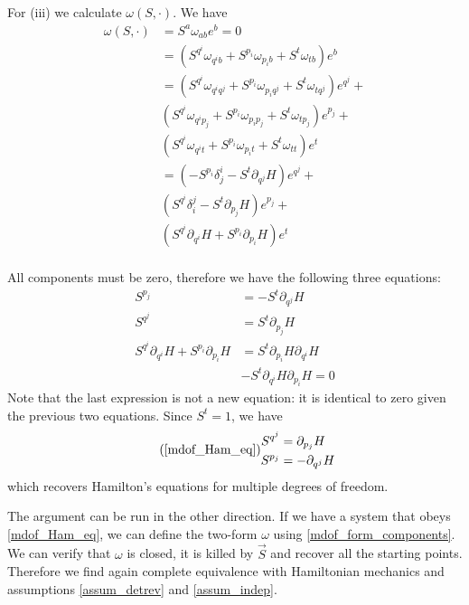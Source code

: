 \documentclass[10pt,twocolumn, nofootinbib]{revtex4-2}
\begin{document}
For (iii) we calculate $\omega(S, \cdot ) $. We have
\begin{equation}
\begin{aligned}
	\omega(S, \cdot )  &= S^a \omega_{ab} e^b = 0 \\
	&= (S^{q^i}\omega_{q^ib} + S^{p_i}\omega_{p_ib} + S^{t}\omega_{tb}) e^b \\
	&= (S^{q^i}\omega_{q^iq^j} + S^{p_i}\omega_{p_iq^j} + S^{t}\omega_{tq^j}) e^{q^j} + \\
	& (S^{q^i}\omega_{q^ip_j} +  S^{p_i}\omega_{p_ip_j} + S^{t}\omega_{tp_j}) e^{p_j} + \\
	& (S^{q^i}\omega_{q^it} + S^{p_i}\omega_{p_it} + S^{t}\omega_{tt}) e^t \\
	&= (-S^{p_i}\delta^i_j - S^{t}\partial_{q^j} H ) e^{q^j} + \\
	& (S^{q^i}\delta^j_i -  S^{t}\partial_{p_j} H) e^{p_j} + \\
	& (S^{q^i} \partial_{q^i} H + S^{p_i} \partial_{p_i} H) e^t \\
\end{aligned}
\end{equation}

All components must be zero, therefore we have the following three equations:
\begin{equation}
\begin{aligned}
	S^{p_j} &= - S^{t} \partial_{q^j} H \\
	S^{q^j} &= S^{t}\partial_{p_j} H \\
	S^{q^i} \partial_{q^i} H + S^{p_i} \partial_{p_i} H &= S^{t}\partial_{p_i} H \partial_{q^i} H \\
	& - S^{t} \partial_{q^i} H \partial_{p_i} H = 0
\end{aligned}
\end{equation}
Note that the last expression is not a new equation: it is identical to zero given the previous two equations. Since $S^t = 1$, we have
\begin{equation}
	\tag*{(\ref{mdof_Ham_eq})}
\begin{aligned}
	S^{q^j} &= \partial_{p_j} H \\
	S^{p_j} &= - \partial_{q^j} H 
\end{aligned}
\end{equation}
which recovers Hamilton's equations for multiple degrees of freedom.

The argument can be run in the other direction. If we have a system that obeys \ref{mdof_Ham_eq}, we can define the two-form $\omega$ using \ref{mdof_form_components}. We can verify that $\omega$ is closed, it is killed by $\vec{S}$ and recover all the starting points. Therefore we find again complete equivalence with Hamiltonian mechanics and assumptions \ref{assum_detrev} and \ref{assum_indep}.
\end{document}
